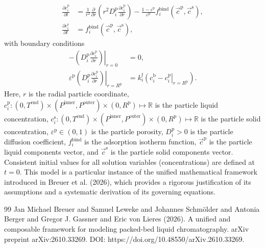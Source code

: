 \documentclass{article}
\begin{document}
\begin{align}
    \frac{\partial c^{\mathrm{p}}_{i}}{\partial t}
    &= \frac{1}{r^{2}} \frac{\partial }{\partial r} \left( r^{2} D^{\mathrm{p}}_{i} \frac{\partial c^{\mathrm{p}}_{i}}{\partial r} \right)
        - \frac{1 - \varepsilon^{\mathrm{p}}}{\varepsilon^{\mathrm{p}}}f^{\mathrm{bind}}_{i}\left( \vec{c}^{\mathrm{p}}, \vec{c}^{\mathrm{s}} \right),
    \\
    \frac{\partial c^{\mathrm{s}}_{i}}{\partial t}
    &= f^{\mathrm{bind}}_{i}\left( \vec{c}^{\mathrm{p}}, \vec{c}^{\mathrm{s}} \right),
\end{align}
with boundary conditions
\begin{align}
    - \left. \left( D^{\mathrm{p}}_{i} \frac{\partial c^{\mathrm{p}}_{i}}{\partial r} \right) \right|_{r=0}
    &= 0,
    \\
    \varepsilon^{\mathrm{p}} \left. \left( D^{\mathrm{p}}_{i} \frac{\partial c^{\mathrm{p}}_{i}}{\partial r} \right)\right|_{r = R^{\mathrm{p}}}
    &= k^{\mathrm{f}}_{i} \left. \left( c^{\mathrm{b}}_{i} - c^{\mathrm{p}}_{i} \right|_{r = R^{\mathrm{p}}} \right).
\end{align}
Here, $r$ is the radial particle coordinate, $c^{\mathrm{p}}_{i}\colon (0, T^{\mathrm{end}}) \times (P^{\mathrm{inner}}, P^{\mathrm{outer}})\times (0, R^{\mathrm{p}}) \mapsto \mathbb{R}$ is the particle liquid concentration, $c^{\mathrm{s}}_{i}\colon (0, T^{\mathrm{end}}) \times (P^{\mathrm{inner}}, P^{\mathrm{outer}})\times (0, R^{\mathrm{p}}) \mapsto \mathbb{R}$ is the particle solid concentration, $\varepsilon^{\mathrm{p}}\in (0, 1)$ is the particle porosity, $D^{\mathrm{p}}_{i}> 0$ is the particle diffusion coefficient, $f^{\mathrm{bind}}_{i}$ is the adsorption isotherm function, $\vec{c}^{\mathrm{p}}$ is the particle liquid components vector, and $\vec{c}^{\mathrm{s}}$ is the particle solid components vector.
Consistent initial values for all solution variables (concentrations) are defined at $t = 0$.
This model is a particular instance of the unified mathematical framework introduced in Breuer et al. (2026), which provides a rigorous justification of its assumptions and a systematic derivation of its governing equations.
\begin{thebibliography}{99}
     Jan Michael Breuer and Samuel Leweke and Johannes Schmölder and Antonia Berger and Gregor J. Gassner and Eric von Lieres (2026). A unified and composable framework for modeling packed-bed liquid chromatography. arXiv preprint arXiv:2610.33269. DOI: https://doi.org/10.48550/arXiv.2610.33269.
\end{thebibliography}
\end{document}
